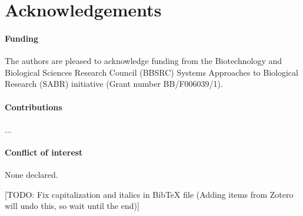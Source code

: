 \documentclass{bioinfo}
\newcommand{\note}[1]{{\color{red}[#1]}}
\begin{document}


\section*{Acknowledgements}

\paragraph{Funding\textcolon} The authors are pleased to acknowledge funding from the Biotechnology and Biological Sciences Research Council (BBSRC) Systems Approaches to Biological Research (SABR) initiative (Grant number BB/F006039/1). 

\paragraph{Contributions\textcolon} ...

\paragraph{Conflict of interest\textcolon} None declared.





\note{TODO: Fix capitalization and italics in BibTeX file (Adding items from Zotero will undo this, so wait until the end)}
\end{document}
